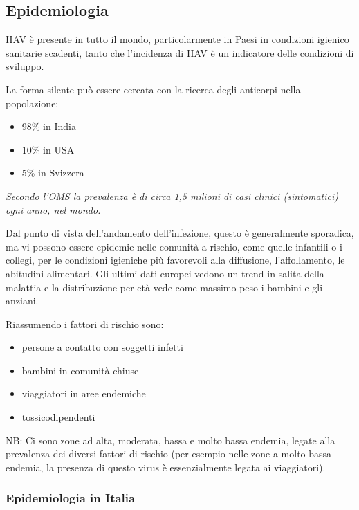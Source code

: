 \subsection{Epidemiologia}


HAV è presente in tutto il mondo, particolarmente in Paesi in condizioni
igienico sanitarie scadenti, tanto che l'incidenza di HAV è un
indicatore delle condizioni di sviluppo.

La forma silente può essere cercata con la ricerca degli anticorpi nella
popolazione:

\begin{itemize}
\item
  98\% in India
\item
  10\% in USA
\item
  5\% in Svizzera
\end{itemize}

\emph{Secondo l'OMS la prevalenza è di circa 1,5 milioni di casi clinici
(sintomatici) ogni anno, nel mondo.}

Dal punto di vista dell'andamento dell'infezione, questo è generalmente
sporadica, ma vi possono essere epidemie nelle comunità a rischio, come
quelle infantili o i collegi, per le condizioni igieniche più favorevoli
alla diffusione, l'affollamento, le abitudini alimentari. Gli ultimi
dati europei vedono un trend in salita della malattia e la distribuzione
per età vede come massimo peso i bambini e gli anziani.

Riassumendo i fattori di rischio sono:

\begin{itemize}
\item
  persone a contatto con soggetti infetti
\item
  bambini in comunità chiuse
\item
  viaggiatori in aree endemiche
\item
  tossicodipendenti
\end{itemize}

NB: Ci sono zone ad alta, moderata, bassa e molto bassa endemia, legate
alla prevalenza dei diversi fattori di rischio (per esempio nelle zone a
molto bassa endemia, la presenza di questo virus è essenzialmente legata
ai viaggiatori).

\subsubsection{Epidemiologia in Italia}



